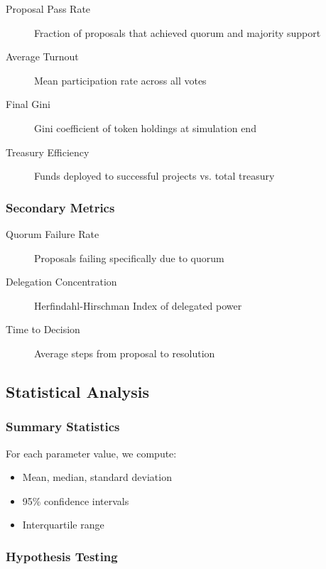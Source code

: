 \begin{description}
    \item[Proposal Pass Rate] Fraction of proposals that achieved quorum and majority support
    \item[Average Turnout] Mean participation rate across all votes
    \item[Final Gini] Gini coefficient of token holdings at simulation end
    \item[Treasury Efficiency] Funds deployed to successful projects vs. total treasury
\end{description}

\subsubsection{Secondary Metrics}

\begin{description}
    \item[Quorum Failure Rate] Proposals failing specifically due to quorum
    \item[Delegation Concentration] Herfindahl-Hirschman Index of delegated power
    \item[Time to Decision] Average steps from proposal to resolution
\end{description}

\subsection{Statistical Analysis}

\subsubsection{Summary Statistics}

For each parameter value, we compute:
\begin{itemize}
    \item Mean, median, standard deviation
    \item 95\% confidence intervals
    \item Interquartile range
\end{itemize}

\subsubsection{Hypothesis Testing}


